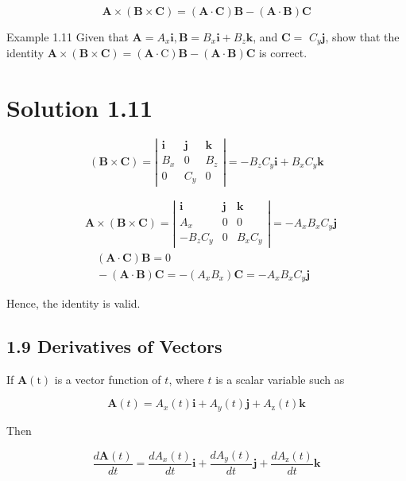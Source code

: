 \documentclass[10pt]{article}
\begin{document}
$$
\mathbf{A} \times(\mathbf{B} \times \mathbf{C})=(\mathbf{A} \cdot \mathbf{C}) \mathbf{B}-(\mathbf{A} \cdot \mathbf{B}) \mathbf{C}
$$

Example 1.11 Given that $\mathbf{A}=A_{x} \mathbf{i}, \mathbf{B}=B_{x} \mathbf{i}+B_{z} \mathbf{k}$, and $\mathbf{C}=$ $C_{y} \mathbf{j}$, show that the identity $\mathbf{A} \times(\mathbf{B} \times \mathbf{C})=(\mathbf{A} \cdot \mathrm{C}) \mathbf{B}-(\mathbf{A} \cdot \mathbf{B}) \mathbf{C}$ is correct.

\section*{Solution 1.11}
$$
(\mathbf{B} \times \mathbf{C})=\left|\begin{array}{lll}
\mathbf{i} & \mathbf{j} & \mathbf{k} \\
B_{x} & 0 & B_{z} \\
0 & C_{y} & 0
\end{array}\right|=-B_{z} C_{y} \mathbf{i}+B_{x} C_{y} \mathbf{k}
$$

$$
\begin{aligned}
& \mathbf{A} \times(\mathbf{B} \times \mathbf{C})=\left|\begin{array}{lll}
\mathbf{i} & \mathbf{j} & \mathbf{k} \\
A_{x} & 0 & 0 \\
-B_{z} C_{y} & 0 & B_{x} C_{y}
\end{array}\right|=-A_{x} B_{x} C_{y} \mathbf{j} \\
& \quad(\mathbf{A} \cdot \mathbf{C}) \mathbf{B}=0 \\
& \quad-(\mathbf{A} \cdot \mathbf{B}) \mathbf{C}=-\left(A_{x} B_{x}\right) \mathbf{C}=-A_{x} B_{x} C_{y} \mathbf{j}
\end{aligned}
$$

Hence, the identity is valid.

\subsection*{1.9 Derivatives of Vectors}
If $\mathbf{A}(\mathrm{t})$ is a vector function of $t$, where $t$ is a scalar variable such as

$$
\mathbf{A}(t)=A_{x}(t) \mathbf{i}+A_{y}(t) \mathbf{j}+A_{\mathrm{z}}(t) \mathbf{k}
$$

Then

$$
\frac{d \mathbf{A}(t)}{d t}=\frac{d A_{x}(t)}{d t} \mathbf{i}+\frac{d A_{y}(t)}{d t} \mathbf{j}+\frac{d A_{\mathrm{z}}(t)}{d t} \mathbf{k}
$$
\end{document}
